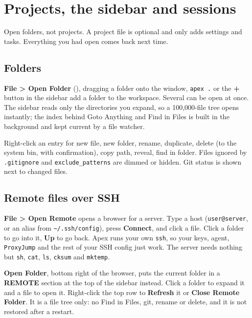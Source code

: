 \documentclass[11pt,a4paper,oneside]{report}
\newcommand{\key}[1]{\fcolorbox{keyline}{keybg}{\footnotesize\texttt{#1}}}
\newcommand{\menu}[1]{\textbf{#1}}
\newcommand{\setting}[1]{\texttt{#1}}
\begin{document}
\chapter{Projects, the sidebar and sessions}

\begin{nutshell}
Open folders, not projects. A project file is optional and only adds
settings and tasks. Everything you had open comes back next time.
\end{nutshell}

\section{Folders}

\menu{File > Open Folder} (\key{Ctrl+Shift+O}), dragging a folder onto the
window, \texttt{apex .} or the \menu{+} button in the sidebar add a folder
to the workspace. Several can be open at once. The sidebar reads only the
directories you expand, so a 100,000-file tree opens instantly; the index
behind Goto Anything and Find in Files is built in the background and kept
current by a file watcher.

Right-click an entry for new file, new folder, rename, duplicate, delete
(to the system bin, with confirmation), copy path, reveal, find in folder.
Files ignored by \texttt{.gitignore} and \setting{exclude\_patterns} are
dimmed or hidden. Git status is shown next to changed files.

\section{Remote files over SSH}\label{sec:remote}

\menu{File > Open Remote} opens a browser for a server. Type a host
(\texttt{user@server}, or an alias from \texttt{\textasciitilde/.ssh/config}),
press \textbf{Connect}, and click a file. Click a folder to go into it,
\textbf{Up} to go back. Apex runs your own \texttt{ssh}, so your keys,
agent, \texttt{ProxyJump} and the rest of your SSH config just work. The
server needs nothing but \texttt{sh}, \texttt{cat}, \texttt{ls},
\texttt{cksum} and \texttt{mktemp}.

\textbf{Open Folder}, bottom right of the browser, puts the current folder
in a \textbf{REMOTE} section at the top of the sidebar instead. Click a
folder to expand it and a file to open it. Right-click the top row to
\textbf{Refresh} it or \textbf{Close Remote Folder}. It is a file tree
only: no Find in Files, git, rename or delete, and it is not restored after
a restart.
\end{document}
